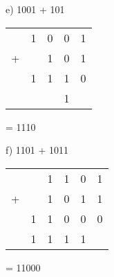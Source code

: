 \begin{figure}[H]
    \begin{minipage}[t]{0.45\textwidth}
        e) 1001 + 101
        \begin{table}[H]
            \centering
            \begin{tabularx}{0.5\linewidth}{rXXXX}
                & 1 & 0 & 0 & 1\\
                + & & 1  & 0 & 1\\
                \cline{2-5}
                & 1 & 1 & 1 & 0 \\
                \cline{2-5}
                &  &  & 1 & 
            \end{tabularx}
        \end{table}
        = 1110
    \end{minipage}\hfill
    \begin{minipage}[t]{0.45\textwidth}
        f) 1101 + 1011
        \begin{table}[H]
            \centering
            \begin{tabularx}{0.5\linewidth}{rXXXXX}
                & & 1 & 1 & 0 & 1\\
                + & &1 & 0  & 1 & 1\\
                \cline{2-6}
                & 1 & 1 & 0 & 0 &0 \\
                \cline{2-6}
                & 1 & 1 & 1 & 1 & 
            \end{tabularx}
        \end{table}
        = 11000
    \end{minipage}\hfill
\end{figure}

